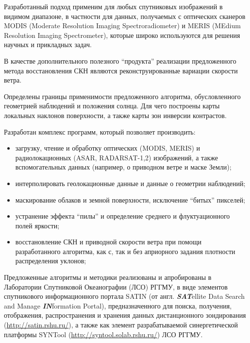 Разработанный подход применим для любых спутниковых изображений в видимом диапазоне, в частности для данных, получаемых с оптических сканеров MODIS (Moderate Resolution Imaging Spectroradiometer) и MERIS (MEdium Resolution Imaging Spectrometer), которые широко используются для решения научных и прикладных задач.

В качестве дополнительного полезного ``продукта'' реализации предложенного метода восстановления СКН являются реконструированные вариации скорости ветра.

Определены границы применимости предложенного алгоритма, обусловленного геометрией наблюдений и положения солнца. Для чего построены карты локальных наклонов поверхности, а также карты зон инверсии контрастов.

Разработан комплекс программ, который позволяет производить:
\begin{itemize}
\item загрузку, чтение и обработку оптических (MODIS, MERIS) и радиолокационных (ASAR, RADARSAT-1,2) изображений, а также вспомогательных данных (например, о приводном ветре и маске Земли);
\item интерполировать геолокационные данные и данные о геометрии наблюдений;
\item маскирование облаков и земной поверхности, исключение ``битых'' пикселей;
\item устранение эффекта ``пилы'' и определение среднего и флуктуационного полей яркости;
\item восстановление СКН и приводной скорости ветра при помощи разработанного алгоритма, как с, так и без априорного задания плотности распределения уклонов;
\end{itemize}

Предложенные алгоритмы и методики реализованы и апробированы в Лаборатории Спутниковой Океанографии (ЛСО) РГГМУ, в виде элементов спутникового информационного портала SATIN (от англ. \textit{\textbf{SAT}}ellite Data Search and Manage \textit{\textbf{IN}}formation Portal), предназначенного для поиска, получения, отображения, распространения и хранения данных дистанционного зондирования (\url{http://satin.rshu.ru/}), а также как элемент разрабатываемой синергетической платформы SYNTool (\url{http://syntool.solab.rshu.ru/}) ЛСО РГГМУ.



\clearpage

